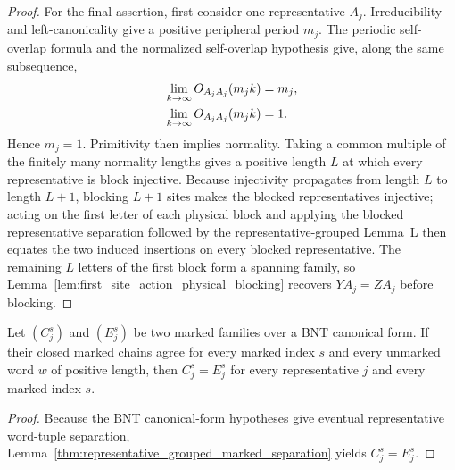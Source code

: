 \begin{proof}
    For the final assertion, first consider one representative $A_j$.
    Irreducibility and left-canonicality give a positive peripheral period
    $m_j$. The periodic self-overlap formula and the normalized self-overlap
    hypothesis give, along the same subsequence,
    \begin{align}
        \lim_{k\to\infty}O_{A_jA_j}(m_jk)
         & =m_j,
        \notag   \\
        \lim_{k\to\infty}O_{A_jA_j}(m_jk)
         & =1.
        \notag
    \end{align}
    Hence $m_j=1$.
    Primitivity then implies normality. Taking a common
    multiple of the finitely many normality lengths gives a positive length
    $L$ at which every representative is block injective. Because injectivity
    propagates from length $L$ to length $L+1$, blocking $L+1$ sites makes the
    blocked representatives injective; acting on the first letter of each
    physical block and applying the blocked representative separation followed
    by the representative-grouped Lemma~L then equates the two induced
    insertions on every blocked representative. The remaining $L$ letters
    of the first block form a spanning family, so
    Lemma~\ref{lem:first_site_action_physical_blocking} recovers
    $YA_j=ZA_j$ before blocking.
\end{proof}

\begin{lemma}
    \label{cor:bnt_marked_representative_separation}
    \leanok
    Let $(C_j^s)$ and $(E_j^s)$ be two marked families over a BNT canonical
    form. If their closed marked chains agree for every marked index $s$ and
    every unmarked word $w$ of positive length, then $C_j^s=E_j^s$ for every
    representative $j$ and every marked index $s$.
\end{lemma}

\begin{proof}
    \leanok
    Because the BNT canonical-form hypotheses give eventual representative
    word-tuple separation,
    Lemma~\ref{thm:representative_grouped_marked_separation} yields
    $C_j^s=E_j^s$.
\end{proof}

